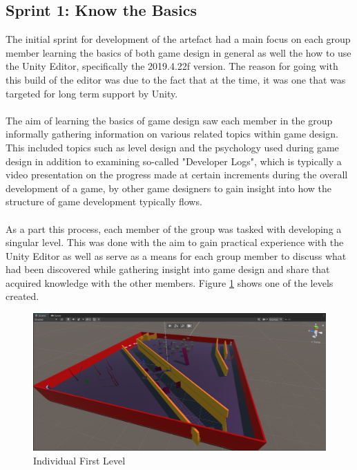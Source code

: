 \subsection{Sprint 1: Know the Basics}
The initial sprint for development of the artefact had a main focus on each group member learning the basics of both game design in general as well the how to use the Unity Editor, specifically the 2019.4.22f version. The reason for going with this build of the editor was due to the fact that at the time, it was one that was targeted for long term support by Unity. 
\\\\
The aim of learning the basics of game design saw each member in the group informally gathering information on various related topics within game design. This included topics such as level design and the psychology used during game design in addition to examining so-called "Developer Logs", which is typically a video presentation on the progress made at certain increments during the overall development of a game, by other game designers to gain insight into how the structure of game development typically flows. 
\\\\
As a part this process, each member of the group was tasked with developing a singular level. This was done with the aim to gain practical experience with the Unity Editor as well as serve as a means for each group member to discuss what had been discovered while gathering insight into game design and share that acquired knowledge with the other members. Figure \ref{1lvl} shows one of the levels created.

\begin{figure}[H]
\centering
\includegraphics[scale=0.33]{Figures/level.png}
\caption{Individual First Level}
\label{1lvl}
\end{figure}


